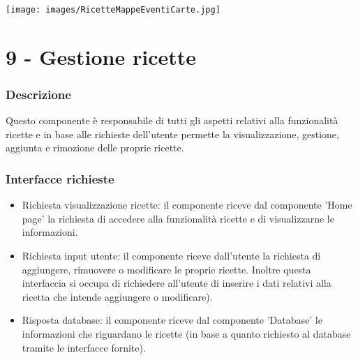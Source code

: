\documentclass[a4paper,12pt]{article}
\begin{document}
\newpage
\begin{center}
  \texttt{[image: images/RicetteMappeEventiCarte.jpg]}
\end{center}

\section*{9 -  Gestione ricette}
\subsubsection*{Descrizione}
Questo componente è responsabile di tutti gli aspetti relativi alla funzionalità ricette e in base alle richieste dell'utente permette la visualizzazione, gestione, aggiunta e rimozione delle proprie ricette.
\subsubsection*{Interfacce richieste}
\begin{itemize} \setlength\itemsep{0.01em}
\item {\sffamily Richiesta visualizzazione ricette}: il componente riceve dal componente 'Home page'  la richiesta di accedere alla funzionalità ricette e di visualizzarne le informazioni.
\item {\sffamily Richiesta input utente}: il componente riceve dall'utente la richiesta di aggiungere, rimuovere o modificare le proprie ricette. Inoltre questa interfaccia si occupa di richiedere all'utente di inserire i dati relativi alla ricetta che intende aggiungere o modificare).
\item {\sffamily Risposta database}: il componente riceve dal componente 'Database' le informazioni che riguardano le ricette (in base a quanto richiesto al database tramite le interfacce fornite).

\end{itemize}
\end{document}
